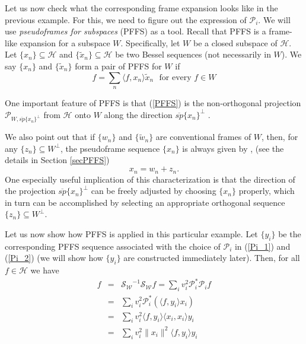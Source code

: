 \documentclass[11pt,reqno]{amsart}
\theoremstyle{remark}
\begin{document}
Let us now check what the corresponding frame expansion looks like in the previous example.  For this, we need to figure out the expression of ${{\mathcal P}}_i$. We will use {\it pseudoframes for subspaces} (PFFS) \cite{LiOgPFFS98} as a tool.    Recall that PFFS is a frame-like expansion for a subspace $W$.  Specifically, let $W$ be a closed subspace of ${\mathcal H}$.   Let $\{x_n\}\subseteq{\mathcal H}$ and $\{\tilde x_n\}\subseteq{\mathcal H}$ be two Bessel sequences (not necessarily in $W$).  We say $\{x_n\}$ and $\{\tilde x_n\}$ form a pair of PFFS for $W$ if
\begin{equation}\label{PFFS}
f =\sum_n{\langle} f, x_n{\rangle} \tilde x_n{\ \ \ }\text{for every }f\in {W}
\end{equation}

One important feature of PFFS is that (\ref{PFFS}) is the non-orthogonal projection ${{\mathcal P}}_{W,{\overline{sp}}\{x_n\}^{\perp}}$ from ${\mathcal H}$ onto $W$ along the direction ${\overline{sp}}\{x_n\}^{\perp}$ \cite{LiOgPFFS98}.

We also point out that if $\{w_n\}$ and $\{\tilde w_n\}$ are conventional frames of $W$, then, for any $\{z_n\}\subseteq W^{\perp}$,  the pseudoframe sequence $\{x_n\}$ is always given by \cite{LiOgPFFS98}, (see the details in Section \ref{secPFFS})
\[
    x_n=w_n + z_n.
\]
One especially useful implication of this characterization is that the direction of the projection ${\overline{sp}}\{x_n\}^{\perp}$ can be freely adjusted by choosing $\{x_n\}$ properly, which in turn can be accomplished by selecting an appropriate orthogonal sequence $\{z_n\}\subseteq W^{\perp}$.

Let us now show how PFFS is applied in this particular example.  Let $\{y_i\}$ be the corresponding PFFS sequence associated with the choice of ${{\mathcal P}}_i$ in (\ref{Pi_1}) and (\ref{Pi_2}) (we will show how $\{y_i\}$ are constructed immediately later).  Then, for all $f\in {\mathcal H}$ we have
\begin{eqnarray}
f &=& {{\mathcal S}_{{\mathcal W}}}^{-1}{{\mathcal S}_{{\mathcal W}}} f = \sum_i v_i^2{{\mathcal P}}^*_i{{\mathcal P}}_i f \nonumber \\
  &=& \sum_i v_i^2 {{\mathcal P}}^*_i\left({\langle} f, y_i{\rangle} x_i\right) \nonumber \\
  &=& \sum_i v_i^2 {\langle} f, y_i{\rangle}{\langle} x_i,x_i{\rangle} y_i  \nonumber \\
  &=& \sum_i v_i^2 \|x_i\|^2 {\langle} f, y_i{\rangle} y_i  \label{step1}
\end{eqnarray}
\end{document}
